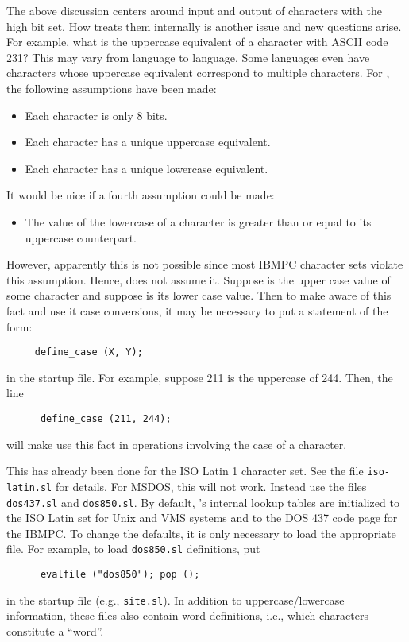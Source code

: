   The above discussion centers around input and output of characters with
  the high bit set.  How \jed{} treats them internally is another issue and new
  questions arise.  For example, what is the uppercase equivalent of a
  character with ASCII code 231?  This may vary from language to language.
  Some languages even have characters whose uppercase equivalent correspond
  to multiple characters.  For \jed{}, the following assumptions have been
  made:
\begin{itemize}
\item Each character is only 8 bits.
\item Each character has a unique uppercase equivalent.
\item Each character has a unique lowercase equivalent.
\end{itemize} 
  It would be nice if a fourth assumption could be made:
\begin{itemize} 
\item The value of the lowercase of a character is greater than or equal to
      its uppercase counterpart.
\end{itemize} 
  However, apparently this is not possible since most IBMPC character sets
  violate this assumption.  Hence, \jed{} does not assume it.  Suppose 
  is the upper case value of some character and suppose  is its lower
  case value.  Then to make \jed{} aware of this fact and use it case
  conversions, it may be necessary to put a statement of the form:
\begin{verbatim}
     define_case (X, Y);
\end{verbatim}
  in the startup file.  For example, suppose 211 is the uppercase of 244.
  Then, the line
\begin{verbatim}
      define_case (211, 244);
\end{verbatim}
  will make \jed{} use this fact in operations involving the case of a character.

  This has already been done for the ISO Latin 1 character set. See the file
  \verb|iso-latin.sl| for details. For MSDOS, this will not work. Instead
  use the files \verb|dos437.sl| and \verb|dos850.sl|.  By default, \jed{}'s
  internal lookup tables are initialized to the ISO Latin set for Unix and
  VMS systems and to the DOS 437 code page for the IBMPC.  To change the
  defaults, it is only necessary to load the appropriate file. For example,
  to load \verb|dos850.sl| definitions, put
\begin{verbatim}
      evalfile ("dos850"); pop ();
\end{verbatim}
  in the startup file (e.g., \verb|site.sl|).  In addition to
  uppercase/lowercase information, these files also contain word
  definitions, i.e., which characters constitute a ``word''.

